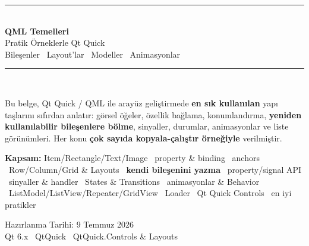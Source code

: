 \documentclass[11pt,a4paper]{article}
\begin{document}
\begin{titlepage}
\centering
\vspace*{1.6cm}
{\color{qtYesil}\rule{\textwidth}{2pt}}\\[6pt]
{\color{anaMavi}\Huge\bfseries QML Temelleri}\\[10pt]
{\color{vurguMavi}\LARGE Pratik Örneklerle Qt Quick}\\[8pt]
{\color{ortaGri}\large Bileşenler \textbullet\ Layout'lar \textbullet\ Modeller \textbullet\ Animasyonlar}\\[6pt]
{\color{qtYesil}\rule{\textwidth}{2pt}}\\[1.6cm]

\begin{tcolorbox}[width=0.88\textwidth,colback=acikMavi,colframe=vurguMavi,arc=4pt,boxrule=1pt]
\centering\large
Bu belge, Qt Quick / QML ile arayüz geliştirmede \textbf{en sık kullanılan}
yapı taşlarını sıfırdan anlatır: görsel öğeler, özellik bağlama, konumlandırma,
\textbf{yeniden kullanılabilir bileşenlere bölme}, sinyaller, durumlar,
animasyonlar ve liste görünümleri. Her konu \textbf{çok sayıda kopyala-çalıştır
örneğiyle} verilmiştir.
\end{tcolorbox}

\vspace{0.9cm}
\begin{tcolorbox}[width=0.88\textwidth,colback=acikGri,colframe=ortaGri!50,arc=3pt,boxrule=0.6pt]
\small
\textbf{Kapsam:} Item/Rectangle/Text/Image \textbullet\ property \& binding
\textbullet\ anchors \textbullet\ Row/Column/Grid \& Layouts \textbullet\
\textbf{kendi bileşenini yazma} \textbullet\ property/signal API \textbullet\
sinyaller \& handler \textbullet\ States \& Transitions \textbullet\ animasyonlar
\& Behavior \textbullet\ ListModel/ListView/Repeater/GridView \textbullet\ Loader
\textbullet\ Qt Quick Controls \textbullet\ en iyi pratikler
\end{tcolorbox}

\vfill
{\color{ortaGri}\large Hazırlanma Tarihi: 9 Temmuz 2026}\\[4pt]
{\color{ortaGri} Qt 6.x \textbullet\ QtQuick \textbullet\ QtQuick.Controls \& Layouts}
\vspace*{0.6cm}
\end{titlepage}

\tableofcontents
\thispagestyle{empty}
\clearpage

\end{document}
